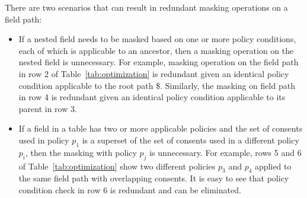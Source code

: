 There are two scenarios that can result in redundant masking operations on a field path: 
\begin{itemize}
    \item If a nested field needs to be masked based on one or more policy conditions, each of which is applicable to an ancestor, then a masking operation on the nested field is unnecessary.  For example, masking operation on the field path in row 2 of Table~\ref{tab:optimization} is redundant given an identical policy condition applicable to the root path \$. Similarly, the masking on field path in row 4 is redundant given an identical policy condition applicable to its parent in row 3.   
    \item If a field in a table has two or more applicable policies and the set of consents used in policy $p_1$ is a superset of the set of consents used in a different policy $p_i$, then the masking with policy $p_j$ is unnecessary. For example, rows 5 and 6 of Table~\ref{tab:optimization} show two different policies $p_3$ and $p_4$ applied to the same field path with overlapping consents. It is easy to see that policy condition check in row 6 is redundant and can be eliminated.
\end{itemize}

\begin{table}[h!]
    \centering
    \caption{Example of maskings with different field paths with applicable policies. Masking operations on field paths in rows 2, 4, and 6 can be pruned without impacting the masking results.}
    \label{tab:optimization}
    \vspace{-2em}
\end{table}

